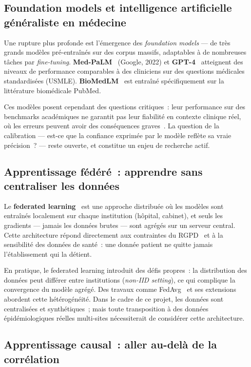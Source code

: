 \subsection{Foundation models et intelligence artificielle généraliste en médecine}

Une rupture plus profonde est l'émergence des \textit{foundation models} --- de très grands modèles pré-entraînés sur des corpus massifs, adaptables à de nombreuses tâches par \textit{fine-tuning}. \textbf{Med-PaLM}~\cite{singhal2023} (Google, 2022) et \textbf{GPT-4}~\cite{openai2023} atteignent des niveaux de performance comparables à des cliniciens sur des questions médicales standardisées (USMLE). \textbf{BioMedLM}~\cite{bolton2022} est entraîné spécifiquement sur la littérature biomédicale PubMed.

Ces modèles posent cependant des questions critiques~: leur performance sur des benchmarks académiques ne garantit pas leur fiabilité en contexte clinique réel, où les erreurs peuvent avoir des conséquences graves~\cite{singhal2023}. La question de la calibration --- est-ce que la confiance exprimée par le modèle reflète sa vraie précision~? --- reste ouverte, et constitue un enjeu de recherche actif.

\subsection{Apprentissage fédéré~: apprendre sans centraliser les données}

Le \textbf{federated learning}~\cite{rieke2020} est une approche distribuée où les modèles sont entraînés localement sur chaque institution (hôpital, cabinet), et seuls les gradients --- jamais les données brutes --- sont agrégés sur un serveur central. Cette architecture répond directement aux contraintes du RGPD~\cite{rgpd2016} et à la sensibilité des données de santé~: une donnée patient ne quitte jamais l'établissement qui la détient.

En pratique, le federated learning introduit des défis propres~: la distribution des données peut différer entre institutions (\textit{non-IID setting}), ce qui complique la convergence du modèle agrégé. Des travaux comme FedAvg~\cite{mcmahan2017} et ses extensions abordent cette hétérogénéité. Dans le cadre de ce projet, les données sont centralisées et synthétiques~; mais toute transposition à des données épidémiologiques réelles multi-sites nécessiterait de considérer cette architecture.

\subsection{Apprentissage causal~: aller au-delà de la corrélation}

